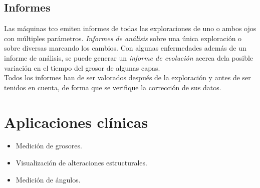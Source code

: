 \subsection{Informes}
Las máquinas \gls{tco} emiten informes de todas las exploraciones de
uno o ambos ojos con múltiples parámetros. \emph{Informes de análisis}
sobre una única exploración o sobre diversas marcando los cambios. Con
algunas enfermedades además de un informe de análisis, se puede
generar un \emph{informe de evolución} acerca dela posible variación
en el tiempo del grosor de algunas capas.\\
Todos los informes han de ser valorados después de la exploración y
antes de ser tenidos en cuenta, de forma que se verifique la
corrección de sus datos.

\section{Aplicaciones clínicas}
\begin{itemize}
\item Medición de grosores.
\item Visualización de alteraciones estructurales.
\item Medición de ángulos.
\end{itemize}